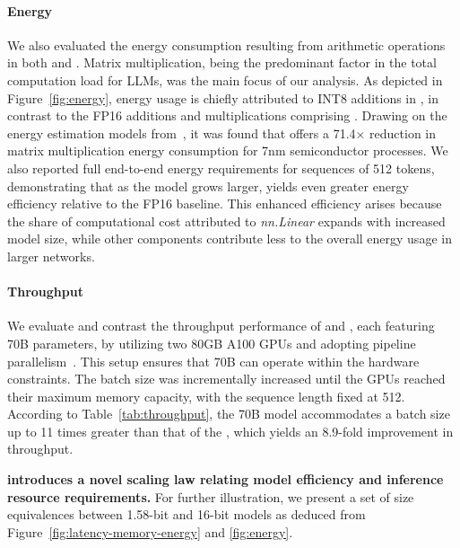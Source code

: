 \paragraph{Energy}

We also evaluated the energy consumption resulting from arithmetic operations in both  and . Matrix multiplication, being the predominant factor in the total computation load for LLMs, was the main focus of our analysis. As depicted in Figure~\ref{fig:energy}, energy usage is chiefly attributed to INT8 additions in , in contrast to the FP16 additions and multiplications comprising . Drawing on the energy estimation models from~\cite{energycost, pokebnn}, it was found that  offers a 71.4$\times$ reduction in matrix multiplication energy consumption for 7nm semiconductor processes. We also reported full end-to-end energy requirements for sequences of 512 tokens, demonstrating that as the model grows larger,  yields even greater energy efficiency relative to the FP16  baseline. This enhanced efficiency arises because the share of computational cost attributed to \emph{nn.Linear} expands with increased model size, while other components contribute less to the overall energy usage in larger networks.

\paragraph{Throughput}

We evaluate and contrast the throughput performance of  and , each featuring 70B parameters, by utilizing two 80GB A100 GPUs and adopting pipeline parallelism~\cite{gpipe}. This setup ensures that  70B can operate within the hardware constraints. The batch size was incrementally increased until the GPUs reached their maximum memory capacity, with the sequence length fixed at 512. According to Table~\ref{tab:throughput}, the  70B model accommodates a batch size up to 11 times greater than that of the , which yields an 8.9-fold improvement in throughput.

\textbf{ introduces a novel scaling law relating model efficiency and inference resource requirements.} For further illustration, we present a set of size equivalences between 1.58-bit and 16-bit models as deduced from Figure~\ref{fig:latency-memory-energy} and \ref{fig:energy}.

